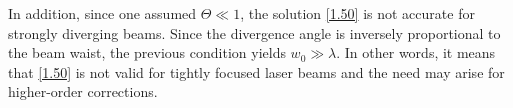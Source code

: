 In addition, since one assumed $ \Theta \ll 1 $, the solution \ref{1.50} is not accurate for strongly diverging beams. Since the divergence angle is inversely proportional to the beam waist, the previous condition yields $ w_0 \gg \lambda $. In other words, it means that \ref{1.50} is not valid for tightly focused laser beams and the need may arise for higher-order corrections. 